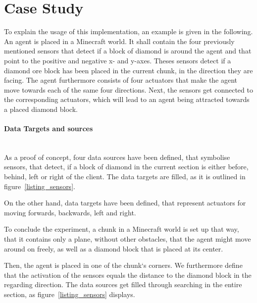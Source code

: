     \section{Case Study}
    \label{case_study}
    


    
To explain the usage of this implementation, an example is given in the following. An agent is placed in a Minecraft world. It shall contain the four previously mentioned sensors that detect if a block of diamond is around the agent and that point to the positive and negative x- and y-axes. Theses sensors detect if a diamond ore block has been placed in the current chunk, in the direction they are facing. The agent furthermore consists of four actuators that make the agent move towards each of the same four directions. Next, the sensors get connected to the corresponding actuators, which will lead to an agent being attracted towards a placed diamond block.

\paragraph{Data Targets and sources}$\;$ \\

As a proof of concept, four data sources have been defined, that symbolise sensors, that detect, if a block of diamond in the current section is either before, behind, left or right of the client. The data targets are filled, as it is outlined in figure~\ref{listing_sensors}.

On the other hand, data targets have been defined, that represent actuators for moving forwards, backwards, left and right.

To conclude the experiment, a chunk in a Minecraft world is set up that way, that it contains only a plane, without other obstacles, that the agent might move around on freely, as well as a diamond block that is placed at its center. 


Then, the agent is placed in one of the chunk`s corners. We furthermore define that the activation of the sensors equals the distance to the diamond block in the regarding direction. The data sources get filled through searching in the entire section, as figure~\ref{listing_sensors} displays.

